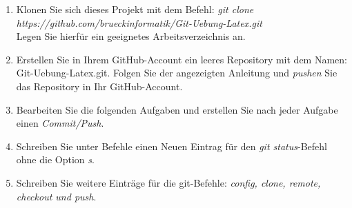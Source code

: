 \documentclass[11pt]{article}
\begin{document}
\begin{enumerate}
  
\item Klonen Sie sich dieses Projekt mit dem Befehl: \linebreak \textsl{git clone https://github.com/brueckinformatik/Git-Uebung-Latex.git}\\
Legen Sie hierfür ein geeignetes Arbeitsverzeichnis an.
\item Erstellen Sie in Ihrem GitHub-Account ein leeres Repository mit dem Namen: Git-Uebung-Latex.git. Folgen Sie der angezeigten Anleitung und \textsl{pushen} Sie das Repository in Ihr GitHub-Account.
\item Bearbeiten Sie die folgenden Aufgaben und erstellen Sie nach jeder Aufgabe einen \textsl{Commit/Push}.
\item Schreiben Sie unter Befehle einen Neuen Eintrag für den \textsl{git status}-Befehl ohne die Option \textsl{s}.
\item Schreiben Sie weitere Einträge für die git-Befehle: \textsl{config, clone, remote, checkout und push}.
\end{enumerate}
\end{document}
